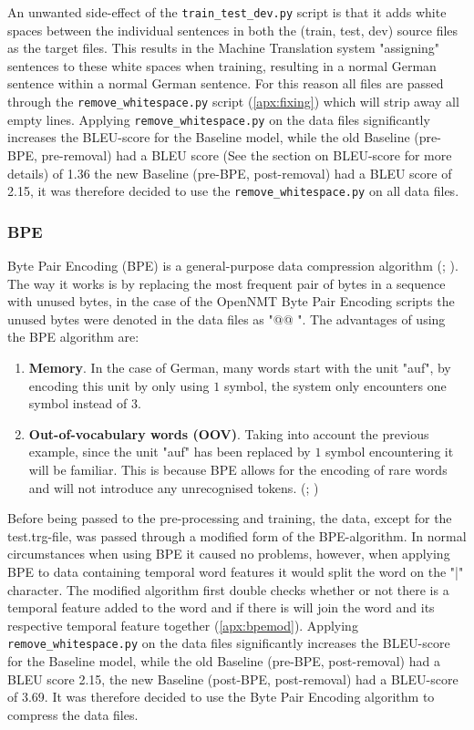 An unwanted side-effect of the \texttt{train\_test\_dev.py} \cite{dimitarshterionovtrain} script is that it adds white spaces between the individual sentences in both the (train, test, dev) source files as the target files. This results in the Machine Translation system "assigning" sentences to these white spaces when training, resulting in a normal German sentence within a normal German sentence. For this reason all files are passed through the \texttt{remove\_whitespace.py} script (\autoref{apx:fixing}) which will strip away all empty lines. Applying \texttt{remove\_whitespace.py} on the data files significantly increases the BLEU-score for the Baseline model, while the old Baseline (pre-BPE, pre-removal) had a BLEU score (See the section on BLEU-score for more details) of 1.36 the new Baseline (pre-BPE, post-removal) had a BLEU score of 2.15, it was therefore decided to use the \texttt{remove\_whitespace.py} on all data files.


\subsubsection{BPE}

Byte Pair Encoding (BPE) is a general-purpose data compression algorithm (\citealp{sennrich2015neural};  \citealp{gage1994new}). The way it works is by replacing the most frequent pair of bytes in a sequence with unused bytes, in the case of the OpenNMT Byte Pair Encoding \cite{klein-etal-2017-opennmt} scripts the unused bytes were denoted in the data files as "@@ ". The advantages of using the BPE algorithm are:

\begin{enumerate}
    \item \textbf{Memory}. In the case of German, many words start with the unit "auf", by encoding this unit by only using $1$ symbol, the system only encounters one symbol instead of $3$. \cite{gage1994new}
    \item \textbf{Out-of-vocabulary words (OOV)}. Taking into account the previous example, since the unit "auf" has been replaced by $1$ symbol encountering it will be familiar. This is because BPE allows for the encoding of rare words and will not introduce any unrecognised tokens. (\citealp{gage1994new}; \citealp{sennrich2015neural})
\end{enumerate}

Before being passed to the pre-processing and training, the data, except for the test.trg-file, was passed through a modified form of the BPE-algorithm. In normal circumstances when using BPE it caused no problems, however, when applying BPE to data containing temporal word features it would split the word on the "|" character. The modified algorithm first double checks whether or not there is a temporal feature added to the word and if there is will join the word and its respective temporal feature together (\autoref{apx:bpemod}). Applying \texttt{remove\_whitespace.py} on the data files significantly increases the BLEU-score for the Baseline model, while the old Baseline (pre-BPE, post-removal) had a BLEU score 2.15, the new Baseline (post-BPE, post-removal) had a BLEU-score of 3.69. It was therefore decided to use the Byte Pair Encoding algorithm to compress the data files. 


